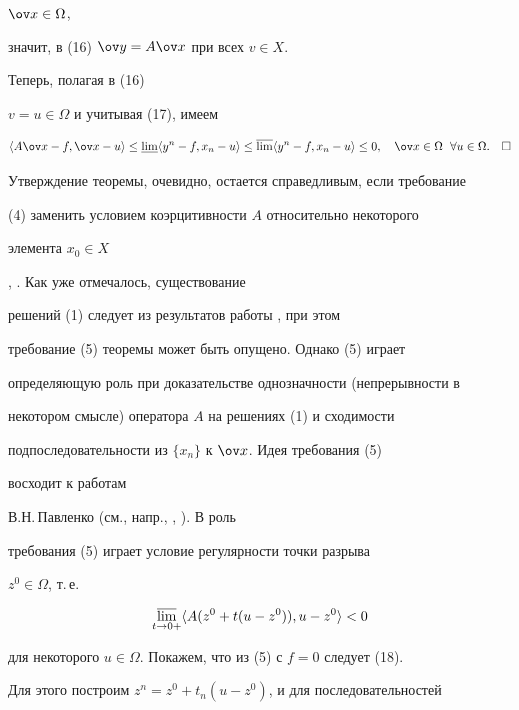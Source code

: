 $\ov x\in\Omega$, 


значит, в (16) $\ov y=A\ov x$ при всех $v\in X$. 


Теперь, полагая в (16) 


$v=u\in\Omega$ и учитывая (17), имеем 


$$ 


\la A\ov x-f,\ov x-u\ra\le\varliminf 


\la y^n-f,x_n-u\ra\le \varlimsup\la y^n-f,x_n-u\ra\le 0,\quad 


\ov x\in\Omega\ \; \forall u\in\Omega. 


\quad\square 


$$ 


 


Утверждение теоремы, очевидно, остается справедливым, если требование 


(4) заменить условием коэрцитивности $A$ относительно некоторого 


элемента $x_0\in X$ 


\cite{2}, \cite{4}. Как уже отмечалось, существование 


решений (1) следует из результатов работы \cite{7}, при этом 


требование (5) теоремы может быть опущено. Однако (5) играет 


определяющую роль при доказательстве однозначности (непрерывности в 


некотором смысле) оператора $A$ на решениях (1) и сходимости 


подпоследовательности из $\{x_n\}$ к $\ov x$. Идея требования (5) 


восходит к работам 


В.Н.\,Павленко (см., напр., \cite{12}, \cite{8}). В \cite{8} роль 


требования (5) играет условие регулярности точки разрыва 


$z^0\in\Omega$, т.\,е. 


\begin{equation} 


\underset{t\to0+}{\varlimsup}{}\la A(z^0+t(u-z^0)), 


u-z^0\ra<0 


\end{equation} 


для некоторого $u\in\Omega$. Покажем, что из (5) с $f=0$ следует (18). 


Для этого построим $z^n=z^0+t_n(u-z^0)$, и для последовательностей 


